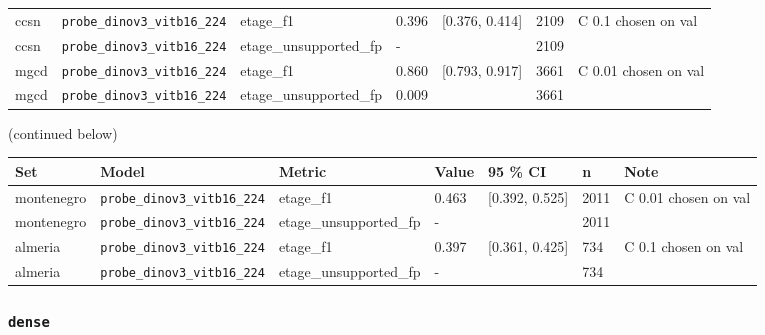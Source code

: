 \begin{center}
{\begin{tabular}{llllllp{7.3cm}}
ccsn & \texttt{probe\_\allowbreak{}dinov3\_\allowbreak{}vitb16\_\allowbreak{}224} & etage\_f1 & 0.396 & [0.376, 0.414] & 2109 & C 0.1 chosen on val \\
ccsn & \texttt{probe\_\allowbreak{}dinov3\_\allowbreak{}vitb16\_\allowbreak{}224} & etage\_unsupported\_fp & - &  & 2109 &  \\
mgcd & \texttt{probe\_\allowbreak{}dinov3\_\allowbreak{}vitb16\_\allowbreak{}224} & etage\_f1 & 0.860 & [0.793, 0.917] & 3661 & C 0.01 chosen on val \\
mgcd & \texttt{probe\_\allowbreak{}dinov3\_\allowbreak{}vitb16\_\allowbreak{}224} & etage\_unsupported\_fp & 0.009 &  & 3661 &  \\
\bottomrule
\end{tabular}}\par\footnotesize(continued below)
\end{center}

\begin{center}{\scriptsize\setlength{\tabcolsep}{3pt}
\begin{tabular}{llllllp{7.3cm}}
\toprule
Set & Model & Metric & Value & 95 \% CI & n & Note \\
\midrule
montenegro & \texttt{probe\_\allowbreak{}dinov3\_\allowbreak{}vitb16\_\allowbreak{}224} & etage\_f1 & 0.463 & [0.392, 0.525] & 2011 & C 0.01 chosen on val \\
montenegro & \texttt{probe\_\allowbreak{}dinov3\_\allowbreak{}vitb16\_\allowbreak{}224} & etage\_unsupported\_fp & - &  & 2011 &  \\
almeria & \texttt{probe\_\allowbreak{}dinov3\_\allowbreak{}vitb16\_\allowbreak{}224} & etage\_f1 & 0.397 & [0.361, 0.425] & 734 & C 0.1 chosen on val \\
almeria & \texttt{probe\_\allowbreak{}dinov3\_\allowbreak{}vitb16\_\allowbreak{}224} & etage\_unsupported\_fp & - &  & 734 &  \\
\bottomrule
\end{tabular}}
\end{center}

\subsubsection{\texttt{dense}}

